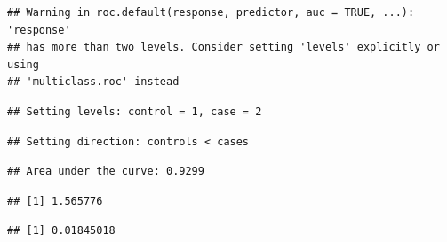 \documentclass[
]{article}
\newenvironment{Shaded}{\begin{snugshade}}{\end{snugshade}}
\newcommand{\AttributeTok}[1]{\textcolor[rgb]{0.77,0.63,0.00}{#1}}
\newcommand{\CommentTok}[1]{\textcolor[rgb]{0.56,0.35,0.01}{\textit{#1}}}
\newcommand{\DecValTok}[1]{\textcolor[rgb]{0.00,0.00,0.81}{#1}}
\newcommand{\FunctionTok}[1]{\textcolor[rgb]{0.00,0.00,0.00}{#1}}
\newcommand{\NormalTok}[1]{#1}
\newcommand{\OtherTok}[1]{\textcolor[rgb]{0.56,0.35,0.01}{#1}}
\newcommand{\SpecialCharTok}[1]{\textcolor[rgb]{0.00,0.00,0.00}{#1}}
\begin{document}
\begin{verbatim}
## Warning in roc.default(response, predictor, auc = TRUE, ...): 'response'
## has more than two levels. Consider setting 'levels' explicitly or using
## 'multiclass.roc' instead
\end{verbatim}

\begin{verbatim}
## Setting levels: control = 1, case = 2
\end{verbatim}

\begin{verbatim}
## Setting direction: controls < cases
\end{verbatim}

\begin{verbatim}
## Area under the curve: 0.9299
\end{verbatim}

\begin{Shaded}
\end{Shaded}

\begin{verbatim}
## [1] 1.565776
\end{verbatim}

\begin{Shaded}
\end{Shaded}

\begin{verbatim}
## [1] 0.01845018
\end{verbatim}

\begin{Shaded}
\end{Shaded}
\end{document}
